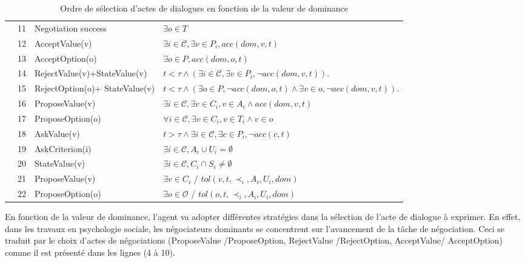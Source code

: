 \begin{table}[!t]
\begin{tabular}{|p{.5cm}|p{.9cm}|p{3.6cm}|p{5.2cm}|}
			\hline
			
			\parbox[t]{2mm}{
				} & 11& Negotiation success &  $\exists o \in T$ \\
			&12& AcceptValue(v) & $\exists i\in\mathcal{C}, \exists v \in P_i, acc(dom, v, t)$ \\
			&13&AcceptOption(o) & $\exists o \in P, acc(dom, o, t)$ \\
			&14&RejectValue(v)+\newline StateValue(v) & $ t<\tau \land (\exists i\in\mathcal{C}, \exists v \in P_i, \neg acc(dom,v, t))$.\\
			&15&RejectOption(o)+ \newline StateValue(v) & $ t<\tau \land (\exists o \in P,  \neg acc(dom,o, t) \land \exists v \in o, \neg acc(dom,v, t))$.\\
			&16&ProposeValue(v) &  $\exists i\in\mathcal{C}, \exists v \in C_i, v \in A_i  \land acc(dom, v, t) $\\
			&17&ProposeOption(o)  & $\forall i\in\mathcal{C},\exists v \in C_i, v \in T_i  \land v \in o$ \\
			&18&AskValue(v) & $t > \tau \land \exists i\in\mathcal{C}, \exists c \in P_i, \neg acc(c, t)$ \\
			&19&AskCriterion(i) & $\exists i\in\mathcal{C}, A_i \cup U_i= \emptyset $\\
			&20&StateValue(v) & $\exists i\in\mathcal{C}, C_i\cap S_i \neq \emptyset$	\\
			&21& ProposeValue(v) & $\exists v \in C_i$ / $tol(v, t, \prec_i, A_i, U_i, dom)$\\
			&22& ProposeOption(o) & $\exists o \in \mathcal{O}$ / $tol(o, t, \prec_i, A_i, U_i, dom)$\\
			
			\hline
		\end{tabular}
		
		\caption{Ordre de sélection d'actes de dialogues en fonction de la valeur de dominance}
		\label{table:uttChoice}
	\end{table}
	
	En fonction de la valeur de dominance, l'agent va adopter différentes stratégies dans la sélection de l'acte de dialogue à exprimer. En effet, dans les travaux en psychologie sociale, les négociateurs dominants se concentrent sur l'avancement de la tâche de négociation. Ceci se traduit par le choix d'actes de négociations (ProposeValue /ProposeOption, RejectValue /RejectOption, AcceptValue/ AcceptOption) comme il est présenté dans les lignes (4 à 10).
	
